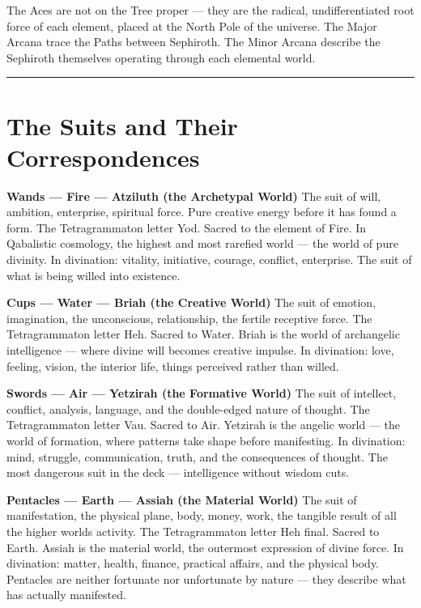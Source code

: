 The Aces are not on the Tree proper --- they are the radical, undifferentiated root force of each element, placed at the North Pole of the universe. The Major Arcana trace the Paths between Sephiroth. The Minor Arcana describe the Sephiroth themselves operating through each elemental world.

\begin{center}\rule{0.5\linewidth}{0.5pt}\end{center}

\section{The Suits and Their Correspondences}\label{the-suits-and-their-correspondences}

\textbf{Wands --- Fire --- Atziluth (the Archetypal World)} The suit of will, ambition, enterprise, spiritual force. Pure creative energy before it has found a form. The Tetragrammaton letter Yod. Sacred to the element of Fire. In Qabalistic cosmology, the highest and most rarefied world --- the world of pure divinity. In divination: vitality, initiative, courage, conflict, enterprise. The suit of what is being willed into existence.

\textbf{Cups --- Water --- Briah (the Creative World)} The suit of emotion, imagination, the unconscious, relationship, the fertile receptive force. The Tetragrammaton letter Heh. Sacred to Water. Briah is the world of archangelic intelligence --- where divine will becomes creative impulse. In divination: love, feeling, vision, the interior life, things perceived rather than willed.

\textbf{Swords --- Air --- Yetzirah (the Formative World)} The suit of intellect, conflict, analysis, language, and the double-edged nature of thought. The Tetragrammaton letter Vau. Sacred to Air. Yetzirah is the angelic world --- the world of formation, where patterns take shape before manifesting. In divination: mind, struggle, communication, truth, and the consequences of thought. The most dangerous suit in the deck --- intelligence without wisdom cuts.

\textbf{Pentacles --- Earth --- Assiah (the Material World)} The suit of manifestation, the physical plane, body, money, work, the tangible result of all the higher worlds\textquotesingle{} activity. The Tetragrammaton letter Heh final. Sacred to Earth. Assiah is the material world, the outermost expression of divine force. In divination: matter, health, finance, practical affairs, and the physical body. Pentacles are neither fortunate nor unfortunate by nature --- they describe what has actually manifested.

